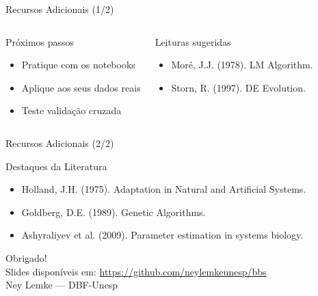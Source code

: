 \begin{frame}{Recursos Adicionais (1/2)}
\begin{columns}
\begin{block}{Próximos passos}
\begin{itemize}
    \item Pratique com os notebooks
    \item Aplique aos seus dados reais
    \item Teste validação cruzada
\end{itemize}
\end{block}

\begin{block}{Leituras sugeridas}
\scriptsize
\begin{itemize}
    \item Moré, J.J. (1978). LM Algorithm.
    \item Storn, R. (1997). DE Evolution.
\end{itemize}
\end{block}
\end{columns}
\end{frame}

\begin{frame}{Recursos Adicionais (2/2)}
\begin{block}{Destaques da Literatura}
\scriptsize
\begin{itemize}
    \item Holland, J.H. (1975). Adaptation in Natural and Artificial Systems.
    \item Goldberg, D.E. (1989). Genetic Algorithms.
    \item Ashyraliyev et al. (2009). Parameter estimation in systems biology.
\end{itemize}
\end{block}
\end{frame}

\begin{frame}{}
\begin{center}
\LARGE
\color{azulescuro}
Obrigado!
\\[1cm]
\normalsize
Slides disponíveis em: \url{https://github.com/neylemkeunesp/bbs}
\\[0.5cm]
\color{gray}
Ney Lemke — DBF-Unesp
\end{center}
\end{frame}


